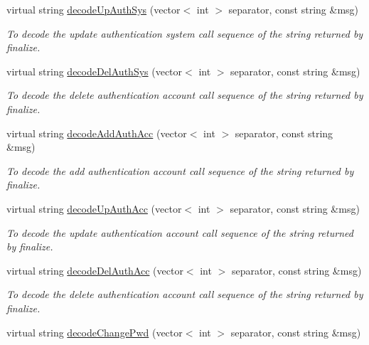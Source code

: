\begin{DoxyCompactItemize}
virtual string \hyperlink{classUMSMapper_a1f7b3a34dc3cd5a92878a769c882f0a0}{decodeUpAuthSys} (vector$<$ int $>$ separator, const string \&msg)
\begin{DoxyCompactList}\small\item\em To decode the update authentication system call sequence of the string returned by finalize. \item\end{DoxyCompactList}\item 
virtual string \hyperlink{classUMSMapper_a12e4e0cfd8efa04aebcee06065a48d97}{decodeDelAuthSys} (vector$<$ int $>$ separator, const string \&msg)
\begin{DoxyCompactList}\small\item\em To decode the delete authentication account call sequence of the string returned by finalize. \item\end{DoxyCompactList}\item 
virtual string \hyperlink{classUMSMapper_abf680914eae5482fd6783b968fee2e79}{decodeAddAuthAcc} (vector$<$ int $>$ separator, const string \&msg)
\begin{DoxyCompactList}\small\item\em To decode the add authentication account call sequence of the string returned by finalize. \item\end{DoxyCompactList}\item 
virtual string \hyperlink{classUMSMapper_a45cbf6f370b84da3bee46325ba66e0f8}{decodeUpAuthAcc} (vector$<$ int $>$ separator, const string \&msg)
\begin{DoxyCompactList}\small\item\em To decode the update authentication account call sequence of the string returned by finalize. \item\end{DoxyCompactList}\item 
virtual string \hyperlink{classUMSMapper_ac00d6b0e9f7f44bc877de50adbcfc87f}{decodeDelAuthAcc} (vector$<$ int $>$ separator, const string \&msg)
\begin{DoxyCompactList}\small\item\em To decode the delete authentication account call sequence of the string returned by finalize. \item\end{DoxyCompactList}\item 
virtual string \hyperlink{classUMSMapper_afc9f56ce3627876213876ebbb0c3cedb}{decodeChangePwd} (vector$<$ int $>$ separator, const string \&msg)

\end{DoxyCompactItemize}
